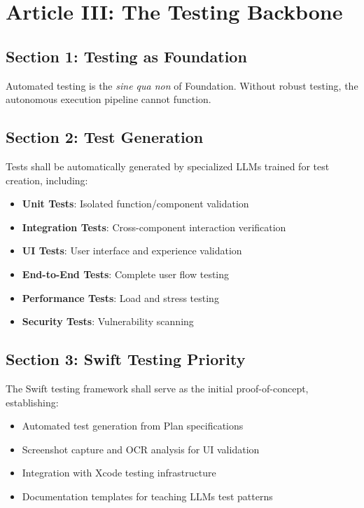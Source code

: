 \documentclass[12pt,letterpaper]{article}
\begin{document}
\section{Article III: The Testing Backbone}

\subsection{Section 1: Testing as Foundation}

Automated testing is the \textit{sine qua non} of Foundation. Without robust testing, the autonomous execution pipeline cannot function.

\subsection{Section 2: Test Generation}

Tests shall be automatically generated by specialized LLMs trained for test creation, including:

\begin{itemize}
    \item \textbf{Unit Tests}: Isolated function/component validation
    \item \textbf{Integration Tests}: Cross-component interaction verification
    \item \textbf{UI Tests}: User interface and experience validation
    \item \textbf{End-to-End Tests}: Complete user flow testing
    \item \textbf{Performance Tests}: Load and stress testing
    \item \textbf{Security Tests}: Vulnerability scanning
\end{itemize}

\subsection{Section 3: Swift Testing Priority}

The Swift testing framework shall serve as the initial proof-of-concept, establishing:

\begin{itemize}
    \item Automated test generation from Plan specifications
    \item Screenshot capture and OCR analysis for UI validation
    \item Integration with Xcode testing infrastructure
    \item Documentation templates for teaching LLMs test patterns
\end{itemize}
\end{document}
